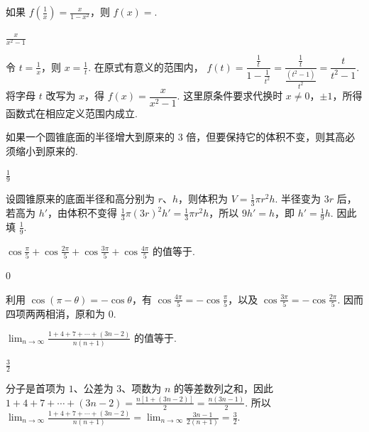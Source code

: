 \begin{problem}

如果 \(f\left(\frac{1}{x}\right)=\frac{x}{1-x^{2}}\)，则 \(f(x)=\)\fillinblank{}.
\begin{answer}
\(\frac{x}{x^{2}-1}\)
\end{answer}

\begin{solution}
令 \(t=\frac1x\)，则 \(x=\frac1t\). 在原式有意义的范围内，
\(f(t)=\dfrac{\frac{1}{t}}{1-\frac{1}{t^{2}}}=\dfrac{\frac{1}{t}}{\frac{(t^{2}-1)}{t^{2}}}=\dfrac{t}{t^{2}-1}\). 将字母 \(t\) 改写为 \(x\)，得 \(f(x)=\dfrac{x}{x^{2}-1}\). 这里原条件要求代换时 \(x\ne0\)，\(\pm1\)，所得函数式在相应定义范围内成立.
\end{solution}
\end{problem}

\begin{problem}

如果一个圆锥底面的半径增大到原来的 3 倍，但要保持它的体积不变，则其高必须缩小到原来的\fillinblank{}.
\begin{answer}
\(\frac{1}{9}\)
\end{answer}

\begin{solution}
设圆锥原来的底面半径和高分别为 \(r\)、\(h\)，则体积为 \(V=\frac13\pi r^{2}h\). 半径变为 \(3r\) 后，若高为 \(h'\)，由体积不变得
\(\frac13\pi(3r)^{2}h'=\frac13\pi r^{2}h\)，所以 \(9h'=h\)，即 \(h'=\frac19h\). 因此填 \(\frac19\).
\end{solution}
\end{problem}

\begin{problem}

\(\cos \frac{\pi}{5} + \cos \frac{2\pi}{5} + \cos \frac{3\pi}{5} + \cos \frac{4\pi}{5}\) 的值等于\fillinblank{}.
\begin{answer}
\(0\)
\end{answer}

\begin{solution}
利用 \(\cos(\pi-\theta)=-\cos\theta\)，有 \(\cos\frac{4\pi}{5}=-\cos\frac{\pi}{5}\)，以及 \(\cos\frac{3\pi}{5}=-\cos\frac{2\pi}{5}\). 因而四项两两相消，原和为 \(0\).
\end{solution}
\end{problem}

\begin{problem}

\(\displaystyle\lim_{n\to\infty}\frac{1 + 4 + 7 + \cdots + (3n - 2)}{n(n + 1)}\) 的值等于\fillinblank{}.
\begin{answer}
\(\frac{3}{2}\)
\end{answer}

\begin{solution}
分子是首项为 \(1\)、公差为 \(3\)、项数为 \(n\) 的等差数列之和，因此
\(1+4+7+\cdots+(3n-2)=\frac{n[1+(3n-2)]}{2}=\frac{n(3n-1)}{2}\). 所以
\(\displaystyle\lim_{n\to\infty}\frac{1+4+7+\cdots+(3n-2)}{n(n+1)}=\lim_{n\to\infty}\frac{3n-1}{2(n+1)}=\frac32\).
\end{solution}
\end{problem}


